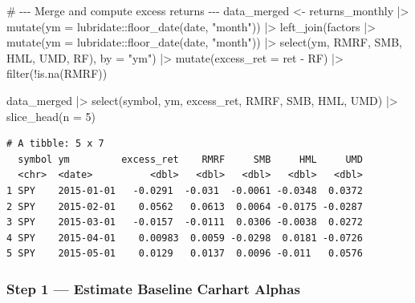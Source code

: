 \documentclass[
  letterpaper,
  DIV=11,
  numbers=noendperiod]{scrartcl}
\newenvironment{Shaded}{\begin{snugshade}}{\end{snugshade}}
\newcommand{\AttributeTok}[1]{\textcolor[rgb]{0.40,0.45,0.13}{#1}}
\newcommand{\CommentTok}[1]{\textcolor[rgb]{0.37,0.37,0.37}{#1}}
\newcommand{\DecValTok}[1]{\textcolor[rgb]{0.68,0.00,0.00}{#1}}
\newcommand{\FunctionTok}[1]{\textcolor[rgb]{0.28,0.35,0.67}{#1}}
\newcommand{\NormalTok}[1]{\textcolor[rgb]{0.00,0.23,0.31}{#1}}
\newcommand{\OtherTok}[1]{\textcolor[rgb]{0.00,0.23,0.31}{#1}}
\newcommand{\SpecialCharTok}[1]{\textcolor[rgb]{0.37,0.37,0.37}{#1}}
\newcommand{\StringTok}[1]{\textcolor[rgb]{0.13,0.47,0.30}{#1}}
\begin{document}
\begin{Shaded}
\begin{Highlighting}[]
\CommentTok{\# {-}{-}{-} Merge and compute excess returns {-}{-}{-}}
\NormalTok{data\_merged }\OtherTok{\textless{}{-}}\NormalTok{ returns\_monthly }\SpecialCharTok{|\textgreater{}}
  \FunctionTok{mutate}\NormalTok{(}\AttributeTok{ym =}\NormalTok{ lubridate}\SpecialCharTok{::}\FunctionTok{floor\_date}\NormalTok{(date, }\StringTok{"month"}\NormalTok{)) }\SpecialCharTok{|\textgreater{}}
  \FunctionTok{left\_join}\NormalTok{(factors }\SpecialCharTok{|\textgreater{}} \FunctionTok{mutate}\NormalTok{(}\AttributeTok{ym =}\NormalTok{ lubridate}\SpecialCharTok{::}\FunctionTok{floor\_date}\NormalTok{(date, }\StringTok{"month"}\NormalTok{)) }\SpecialCharTok{|\textgreater{}}
              \FunctionTok{select}\NormalTok{(ym, RMRF, SMB, HML, UMD, RF),}
            \AttributeTok{by =} \StringTok{"ym"}\NormalTok{) }\SpecialCharTok{|\textgreater{}}
  \FunctionTok{mutate}\NormalTok{(}\AttributeTok{excess\_ret =}\NormalTok{ ret }\SpecialCharTok{{-}}\NormalTok{ RF) }\SpecialCharTok{|\textgreater{}}
  \FunctionTok{filter}\NormalTok{(}\SpecialCharTok{!}\FunctionTok{is.na}\NormalTok{(RMRF))}

\NormalTok{data\_merged }\SpecialCharTok{|\textgreater{}}
  \FunctionTok{select}\NormalTok{(symbol, ym, excess\_ret, RMRF, SMB, HML, UMD) }\SpecialCharTok{|\textgreater{}}
  \FunctionTok{slice\_head}\NormalTok{(}\AttributeTok{n =} \DecValTok{5}\NormalTok{)}
\end{Highlighting}
\end{Shaded}

\begin{verbatim}
# A tibble: 5 x 7
  symbol ym         excess_ret    RMRF     SMB     HML     UMD
  <chr>  <date>          <dbl>   <dbl>   <dbl>   <dbl>   <dbl>
1 SPY    2015-01-01   -0.0291  -0.031  -0.0061 -0.0348  0.0372
2 SPY    2015-02-01    0.0562   0.0613  0.0064 -0.0175 -0.0287
3 SPY    2015-03-01   -0.0157  -0.0111  0.0306 -0.0038  0.0272
4 SPY    2015-04-01    0.00983  0.0059 -0.0298  0.0181 -0.0726
5 SPY    2015-05-01    0.0129   0.0137  0.0096 -0.011   0.0576
\end{verbatim}

\subsubsection{Step 1 --- Estimate Baseline Carhart
Alphas}\label{step-1-estimate-baseline-carhart-alphas}
\end{document}
